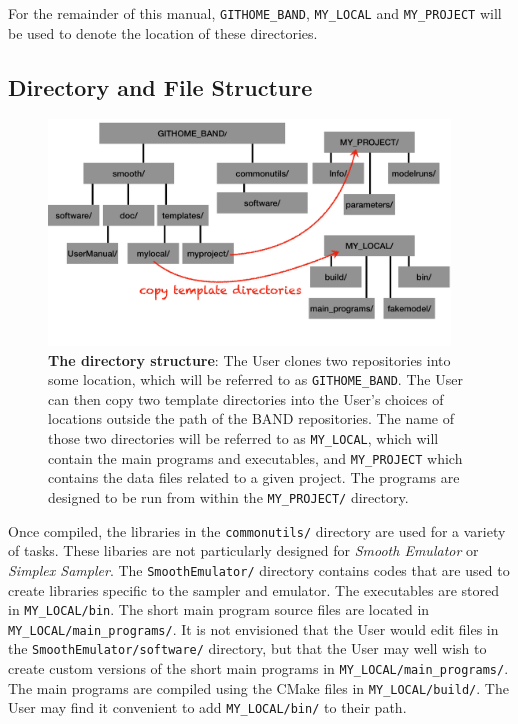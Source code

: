 \documentclass[UserManual.tex]{subfiles}
\begin{document}
For the remainder of this manual, {\tt GITHOME\_BAND}, {\tt MY\_LOCAL} and {\tt MY\_PROJECT} will be used to denote the location of these directories.

\subsection{Directory and File Structure}

\begin{figure}
\centerline{\includegraphics[width = 0.95\textwidth]{directorystructure}}
\caption{{\bf The directory structure}: The User clones two repositories into some location, which will be referred to as {\tt GITHOME\_BAND}. The User can then copy two template directories into the User's choices of locations outside the path of the BAND repositories. The name of those two directories will be referred to as {\tt MY\_LOCAL}, which will contain the main programs and executables, and {\tt MY\_PROJECT} which contains the data files related to a given project. The programs are designed to be run from within the {\tt MY\_PROJECT/} directory.}
\end{figure}

Once compiled, the libraries in the {\tt commonutils/} directory are used for a variety of tasks. These libaries are not particularly designed for {\it Smooth Emulator} or {\it Simplex Sampler}. The {\tt SmoothEmulator/} directory contains codes that are used to create libraries specific to the sampler and emulator. The executables are stored in {\tt MY\_LOCAL/bin}. The short main program source files are located in {\tt MY\_LOCAL/main\_programs/}. It is not envisioned that the User would edit files in the {\tt SmoothEmulator/software/} directory, but that the User may well wish to create custom versions of the short main programs in {\tt MY\_LOCAL/main\_programs/}. The main programs are compiled using the CMake files in {\tt MY\_LOCAL/build/}. The User may find it convenient to add {\tt MY\_LOCAL/bin/} to their path.
\end{document}
